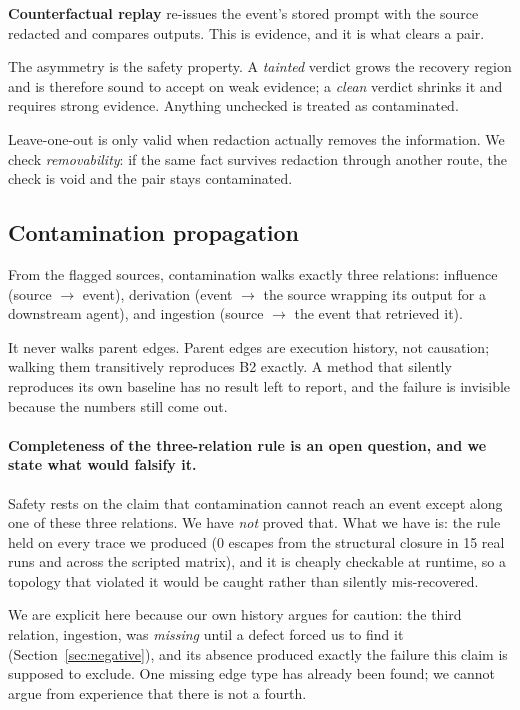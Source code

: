 \documentclass[10pt,twocolumn]{article}
\newcommand{\btwo}{\textsf{B2}}
\begin{document}
\textbf{Counterfactual replay} re-issues the event's stored prompt with the
source redacted and compares outputs. This is evidence, and it is what clears
a pair.

The asymmetry is the safety property. A \emph{tainted} verdict grows the
recovery region and is therefore sound to accept on weak evidence; a
\emph{clean} verdict shrinks it and requires strong evidence. Anything
unchecked is treated as contaminated.

Leave-one-out is only valid when redaction actually removes the information.
We check \emph{removability}: if the same fact survives redaction through
another route, the check is void and the pair stays contaminated.

\subsection{Contamination propagation}

From the flagged sources, contamination walks exactly three relations:
influence (source $\rightarrow$ event), derivation (event $\rightarrow$ the
source wrapping its output for a downstream agent), and ingestion (source
$\rightarrow$ the event that retrieved it).

It never walks parent edges. Parent edges are execution history, not
causation; walking them transitively reproduces \btwo{} exactly. A method that
silently reproduces its own baseline has no result left to report, and the
failure is invisible because the numbers still come out.

\paragraph{Completeness of the three-relation rule is an open question, and we
state what would falsify it.}
Safety rests on the claim that contamination cannot reach an event except
along one of these three relations. We have \emph{not} proved that. What we
have is: the rule held on every trace we produced ($0$ escapes from the
structural closure in 15 real runs and across the scripted matrix), and it is
cheaply checkable at runtime, so a topology that violated it would be caught
rather than silently mis-recovered.

We are explicit here because our own history argues for caution: the third
relation, ingestion, was \emph{missing} until a defect forced us to find it
(Section~\ref{sec:negative}), and its absence produced exactly the failure
this claim is supposed to exclude. One missing edge type has already been
found; we cannot argue from experience that there is not a fourth.
\end{document}
